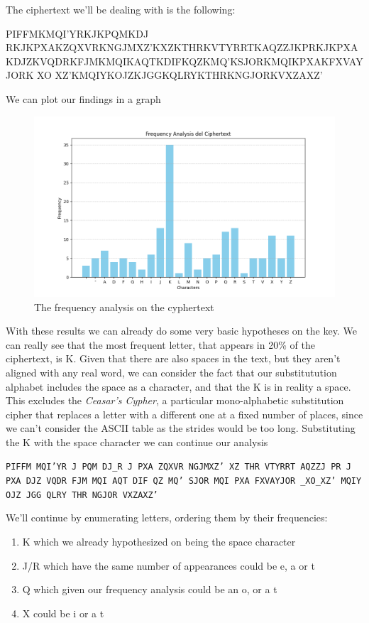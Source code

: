 \documentclass{article}
\begin{document}
The ciphertext we'll be dealing with is the following:

PIFFMKMQI'YRKJKPQMKDJ RKJKPXAKZQXVRKNGJMXZ'KXZKTHRKVTYRRTKAQZZJKPRKJKPXAKDJZKVQDRKFJMKMQIKAQTKDIFKQZKMQ'KSJORKMQIKPXAKFXVAYJORK XO XZ'KMQIYKOJZKJGGKQLRYKTHRKNGJORKVXZAXZ'

We can plot our findings in a graph
\begin{figure}[h]
    \centering
    \includegraphics[width=0.8\linewidth]{frequency.png}
    \caption{The frequency analysis on the cyphertext}
\end{figure}

With these results we can already do some very basic hypotheses on the key. We can really see that the most frequent letter, that appears in 20\% of the ciphertext, is K. Given that there are also spaces in the text, but they aren't aligned with any real word, we can consider the fact that our substitutution alphabet includes the space as a character, and that the K is in reality a space. This excludes the \emph{Ceasar's Cypher}, a particular mono-alphabetic substitution cipher that replaces a letter with a different one at a fixed number of places, since we can't consider the ASCII table as the strides would be too long. 
Substituting the K with the space character we can continue our analysis

\texttt{PIFFM MQI'YR J PQM DJ\_R J PXA ZQXVR NGJMXZ' XZ THR VTYRRT AQZZJ PR J PXA DJZ VQDR FJM MQI AQT DIF QZ MQ' SJOR MQI PXA FXVAYJOR \_XO\_XZ' MQIY OJZ JGG QLRY THR NGJOR VXZAXZ'}

We'll continue by enumerating letters, ordering them by their frequencies:
\begin{enumerate}
    \item K which we already hypothesized on being the space character
    \item J/R which have the same number of appearances could be e, a or t
    \item Q which given our frequency analysis could be an o, or a t
    \item X could be i or a t
\end{enumerate}
\end{document}
